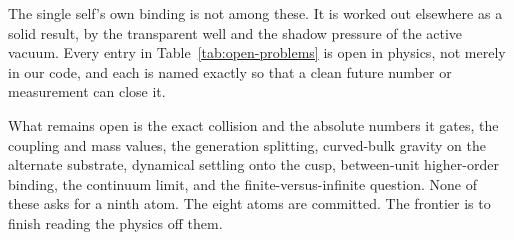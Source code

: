 The single self's own binding is not among these. It is worked out elsewhere as a solid result, by the transparent well and the shadow pressure of the active vacuum. Every entry in Table~\ref{tab:open-problems} is open in physics, not merely in our code, and each is named exactly so that a clean future number or measurement can close it.

\begin{result}
What remains open is the exact collision and the absolute numbers it gates, the coupling and mass values, the generation splitting, curved-bulk gravity on the alternate substrate, dynamical settling onto the cusp, between-unit higher-order binding, the continuum limit, and the finite-versus-infinite question. None of these asks for a ninth atom. The eight atoms are committed. The frontier is to finish reading the physics off them.
\end{result}
